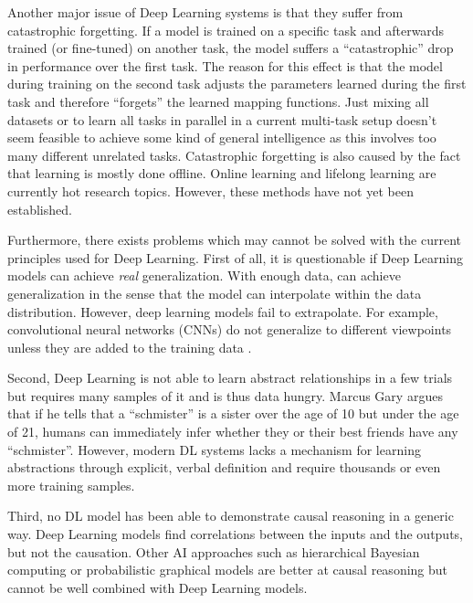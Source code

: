 Another major issue of Deep Learning systems is that they suffer from catastrophic forgetting.
If a model is trained on a specific task and afterwards trained (or fine-tuned) on another task, the model suffers a ``catastrophic'' drop in performance over the first task.
The reason for this effect is that the model during training on the second task adjusts the parameters learned during the first task and therefore ``forgets'' the learned mapping functions.
Just mixing all datasets or to learn all tasks in parallel in a current multi-task setup \cite{Zhang_Yang_2021} doesn't seem feasible to achieve some kind of general intelligence as this involves too many different unrelated tasks.
Catastrophic forgetting is also caused by the fact that learning is mostly done offline.
Online learning \cite{Sahoo_Pham_Lu_Hoi_2017} and lifelong learning \cite{Parisi_Kemker_Part_Kanan_Wermter_2019} are currently hot research topics.
However, these methods have not yet been established.

Furthermore, there exists problems which may cannot be solved with the current principles used for Deep Learning.
First of all, it is questionable if Deep Learning models can achieve \emph{real} generalization.
With enough data, can achieve generalization in the sense that the model can interpolate within the data distribution.
However, deep learning models fail to extrapolate.
For example, convolutional neural networks (CNNs) do not generalize to different viewpoints unless they are added to the training data .

Second, Deep Learning is not able to learn abstract relationships in a few trials but requires many samples of it and is thus data hungry.
Marcus Gary  argues that if he tells that a ``schmister'' is a sister over the age of 10 but under the age of 21, humans can  immediately infer whether they or their best friends have any ``schmister''. However, modern DL systems lacks a mechanism for learning abstractions through explicit, verbal definition and require thousands or even more training samples.

Third, no DL model has been able to demonstrate causal reasoning in a generic way.
Deep Learning models find correlations between the inputs and the outputs, but not the causation.
Other AI approaches such as hierarchical Bayesian computing or probabilistic graphical models are better at causal reasoning but cannot be well combined with Deep Learning models.

